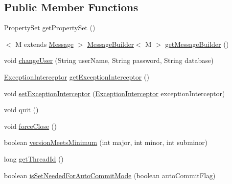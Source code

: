 \subsection*{Public Member Functions}
\begin{DoxyCompactItemize}
\item 
\mbox{\hyperlink{interfacecom_1_1mysql_1_1cj_1_1conf_1_1_property_set}{Property\+Set}} \mbox{\hyperlink{interfacecom_1_1mysql_1_1cj_1_1_session_a76c18a20fdd1ad088a8053f236c57eb5}{get\+Property\+Set}} ()
\item 
$<$ M extends \mbox{\hyperlink{interfacecom_1_1mysql_1_1cj_1_1protocol_1_1_message}{Message}} $>$ \mbox{\hyperlink{interfacecom_1_1mysql_1_1cj_1_1_message_builder}{Message\+Builder}}$<$ M $>$ \mbox{\hyperlink{interfacecom_1_1mysql_1_1cj_1_1_session_ab2182c03050810ec8fa253a912c72e10}{get\+Message\+Builder}} ()
\item 
void \mbox{\hyperlink{interfacecom_1_1mysql_1_1cj_1_1_session_ae89407fa6e67fd4537f06c85f0a2695b}{change\+User}} (String user\+Name, String password, String database)
\item 
\mbox{\hyperlink{interfacecom_1_1mysql_1_1cj_1_1exceptions_1_1_exception_interceptor}{Exception\+Interceptor}} \mbox{\hyperlink{interfacecom_1_1mysql_1_1cj_1_1_session_a7e83fb6016b811e8bf9903c183a814ca}{get\+Exception\+Interceptor}} ()
\item 
void \mbox{\hyperlink{interfacecom_1_1mysql_1_1cj_1_1_session_ad05f11c98222964b8b57be538e65d805}{set\+Exception\+Interceptor}} (\mbox{\hyperlink{interfacecom_1_1mysql_1_1cj_1_1exceptions_1_1_exception_interceptor}{Exception\+Interceptor}} exception\+Interceptor)
\item 
void \mbox{\hyperlink{interfacecom_1_1mysql_1_1cj_1_1_session_af29d73c4e1343fb4bee53b0bac720108}{quit}} ()
\item 
void \mbox{\hyperlink{interfacecom_1_1mysql_1_1cj_1_1_session_a4394068e5b6e4534ae8d2d90ea4be2c6}{force\+Close}} ()
\item 
boolean \mbox{\hyperlink{interfacecom_1_1mysql_1_1cj_1_1_session_a480ce810135103101a0d39c5fbcd2ff0}{version\+Meets\+Minimum}} (int major, int minor, int subminor)
\item 
long \mbox{\hyperlink{interfacecom_1_1mysql_1_1cj_1_1_session_a01afd0778a66788ef0d93cb9c20baf5a}{get\+Thread\+Id}} ()
\item 
boolean \mbox{\hyperlink{interfacecom_1_1mysql_1_1cj_1_1_session_a3f747951ef258e5219237177aa3d4311}{is\+Set\+Needed\+For\+Auto\+Commit\+Mode}} (boolean auto\+Commit\+Flag)
\item 

\end{DoxyCompactItemize}
